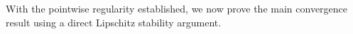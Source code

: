 \documentclass[11pt]{article}
\theoremstyle{definition}
\numberwithin{equation}{section}%
\begin{document}
{%


With the pointwise regularity established, we now prove the main convergence result using a direct Lipschitz stability argument.}
\end{document}
